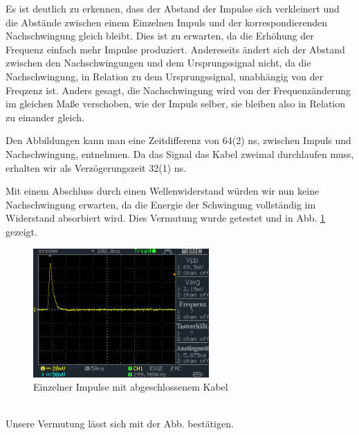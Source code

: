 \documentclass[a4paper,10pt]{article}
\numberwithin{equation}{section}
\begin{document}
Es ist deutlich zu erkennen, dass der Abstand der Impulse sich verkleinert und die Abstände zwischen einem Einzelnen Impuls und der korrespondierenden Nachschwingung gleich bleibt. Dies ist zu erwarten, da die Erhöhung der Frequenz einfach mehr Impulse produziert. Andereseits ändert sich der Abstand zwischen den Nachschwingungen und dem Ursprungssignal nicht, da die Nachschwingung, in Relation zu dem Ursprungssignal, unabhängig von der Freqzenz ist. Anders gesagt, die Nachschwingung wird von der Frequenzänderung im gleichen Maße verschoben, wie der Impuls selber, sie bleiben also in Relation zu einander gleich.

Den Abbildungen kann man eine Zeitdifferenz von 64(2) ns, zwischen Impuls und Nachschwingung, entnehmen. Da das Signal das Kabel zweimal durchlaufen muss, erhalten wir als Verzögerungszeit 32(1) ns.

Mit einem Abschluss durch einen Wellenwiderstand würden wir nun keine Nachschwingung erwarten, da die Energie der Schwingung vollständig im Widerstand absorbiert wird. Dies Vermutung wurde getestet und in Abb. \ref{fig:3.10} gezeigt.
\begin{figure}[h]
        \centering
        \includegraphics[width=0.6\textwidth]{data/DS0026.BMP.png}
        \caption{Einzelner Impulse mit abgeschlossenem Kabel}
		\label{fig:3.10}
\end{figure}\\
Unsere Vermutung lässt sich mit der Abb. bestätigen.

\clearpage
\end{document}

